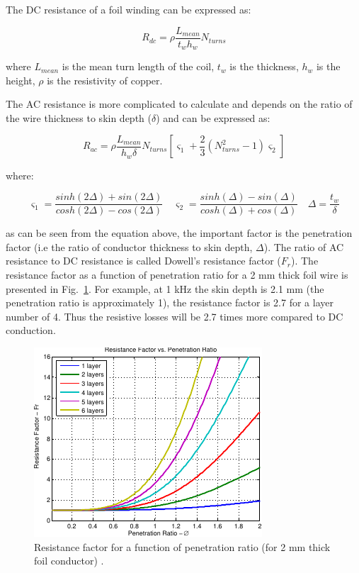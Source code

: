 \documentclass[a4paper, 11pt]{article} %
\begin{document}
The DC resistance of a foil winding can be expressed as:

\begin{equation}
  R_{dc} = \rho \frac{L_{mean}}{t_w h_w} N_{turns}
\end{equation}

where $L_{mean}$ is the mean turn length of the coil, $t_w$ is the thickness, $h_w$ is the height, $\rho$ is the resistivity of copper.

The AC resistance is more complicated to calculate and depends on the ratio of the wire thickness to skin depth ($\delta$) and can be expressed as:

\begin{equation}
  R_{ac}=\rho \frac{L_{mean}}{h_w \delta} N_{turns} \left[\varsigma_1 + \frac{2}{3} (N_{turns}^2-1)\varsigma_2\right]
  \label{R_ac_foil}
\end{equation}

where:

\begin{equation}
  \varsigma_1 = \dfrac{sinh(2\Delta)+sin(2\Delta)}{cosh(2\Delta)-cos(2\Delta)} \quad
  \varsigma_2 = \dfrac{sinh(\Delta)-sin(\Delta)}{cosh(\Delta)+cos(\Delta)} \quad  
  \Delta = \dfrac{t_w}{\delta}
\end{equation}

as can be seen from the equation above,  the important factor is the penetration factor (i.e the ratio of conductor thickness to skin depth, $\Delta$). The ratio of AC resistance to DC resistance is called Dowell's resistance factor ($F_r$). The resistance factor as a function of penetration ratio for a 2 mm thick foil wire is presented in Fig.~\ref{resistance_factor}. For example, at 1 kHz the skin depth is 2.1 mm (the penetration ratio is approximately 1), the resistance factor is 2.7 for a layer number of 4. Thus the resistive losses will be 2.7 times more compared to DC conduction.

\begin{figure}[]
  \centering
    \includegraphics[scale=1.25]{resistance_factor}
  \caption{Resistance factor for a function of penetration ratio (for 2 mm thick foil conductor) \cite{Villar2010}.}
  \label{resistance_factor}
\end{figure}
\end{document}
